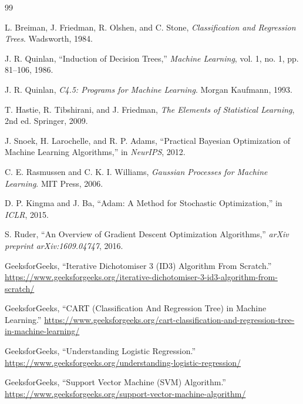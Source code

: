 \documentclass{article}
\begin{document}
\begin{thebibliography}{99}

    L. Breiman, J. Friedman, R. Olshen, and C. Stone, \textit{Classification and Regression Trees}. Wadsworth, 1984.

    J. R. Quinlan, ``Induction of Decision Trees,'' \textit{Machine Learning}, vol. 1, no. 1, pp. 81--106, 1986.

    J. R. Quinlan, \textit{C4.5: Programs for Machine Learning}. Morgan Kaufmann, 1993.

    T. Hastie, R. Tibshirani, and J. Friedman, \textit{The Elements of Statistical Learning}, 2nd ed. Springer, 2009.

    J. Snoek, H. Larochelle, and R. P. Adams, ``Practical Bayesian Optimization of Machine Learning Algorithms,'' in \textit{NeurIPS}, 2012.

    C. E. Rasmussen and C. K. I. Williams, \textit{Gaussian Processes for Machine Learning}. MIT Press, 2006.

    D. P. Kingma and J. Ba, ``Adam: A Method for Stochastic Optimization,'' in \textit{ICLR}, 2015.

    S. Ruder, ``An Overview of Gradient Descent Optimization Algorithms,'' \textit{arXiv preprint arXiv:1609.04747}, 2016.

    GeeksforGeeks, ``Iterative Dichotomiser 3 (ID3) Algorithm From Scratch.'' \url{https://www.geeksforgeeks.org/iterative-dichotomiser-3-id3-algorithm-from-scratch/}

    GeeksforGeeks, ``CART (Classification And Regression Tree) in Machine Learning.'' \url{https://www.geeksforgeeks.org/cart-classification-and-regression-tree-in-machine-learning/}

    GeeksforGeeks, ``Understanding Logistic Regression.'' \url{https://www.geeksforgeeks.org/understanding-logistic-regression/}

    GeeksforGeeks, ``Support Vector Machine (SVM) Algorithm.'' \url{https://www.geeksforgeeks.org/support-vector-machine-algorithm/}

\end{thebibliography}
\end{document}
